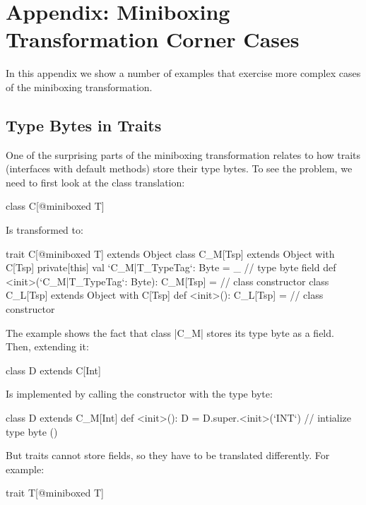 \section{Appendix: Miniboxing Transformation Corner Cases}

In this appendix we show a number of examples that exercise more complex cases of the miniboxing transformation.

\subsection{Type Bytes in Traits}

One of the surprising parts of the miniboxing transformation relates to how traits (interfaces with default methods) store their type bytes. To see the problem, we need to first look at the class translation:

\begin{lstlisting-nobreak}
class C[@miniboxed T]
\end{lstlisting-nobreak}

Is transformed to:

\begin{lstlisting-nobreak}
trait C[@miniboxed T] extends Object
class C_M[Tsp] extends Object with C[Tsp] {
  private[this] val `C_M|T_TypeTag`: Byte = _ // type byte field
  def <init>(`C_M|T_TypeTag`: Byte): C_M[Tsp] = // class constructor
}
class C_L[Tsp] extends Object with C[Tsp] {
  def <init>(): C_L[Tsp] =  // class constructor
}
\end{lstlisting-nobreak}

The example shows the fact that class |C_M| stores its type byte as a field. Then, extending it:

\begin{lstlisting-nobreak}
class D extends C[Int]
\end{lstlisting-nobreak}

Is implemented by calling the constructor with the type byte:

\begin{lstlisting-nobreak}
class D extends C_M[Int] {
  def <init>(): D = {
    D.super.<init>(`INT`) // intialize type byte
    ()
  }
}
\end{lstlisting-nobreak}

But traits cannot store fields, so they have to be translated differently. For example:

\begin{lstlisting-nobreak}
trait T[@miniboxed T]
\end{lstlisting-nobreak}


